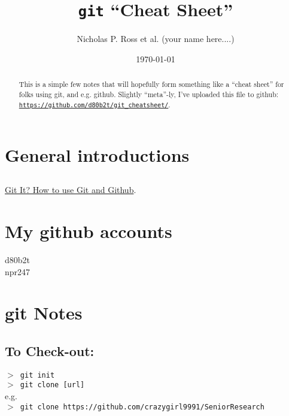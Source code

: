 \documentclass[11pt,a4paper]{article}
\begin{document}
\title{{\tt git} ``Cheat Sheet''}
\author{Nicholas P. Ross et al. (your name here....)}
\date{\today}
\maketitle



\begin{abstract}
This is a simple few notes that will hopefully form something like a ``cheat sheet'' for 
folks using git, and e.g. github. Slightly ``meta''-ly, I've uploaded this file to github:\\
\href{https://github.com/d80b2t/git\_cheatsheet}{{\tt https://github.com/d80b2t/git\_cheatsheet/}}.
\end{abstract}


\section{General introductions}

\subsection{}
 \href{https://www.youtube.com/watch?v=HkdAHXoRtos}{Git It? How to use Git and Github}.


 

\section{My github accounts}
d80b2t\\
npr247\\




\section{git Notes}

    \subsection{To Check-out:}
   {\tt  $>$ git init\\
    $>$ git clone [url]} \\
     e.g.\\ 
    {\tt $>$ git clone https://github.com/crazygirl9991/SeniorResearch\\
   }
\end{document}

